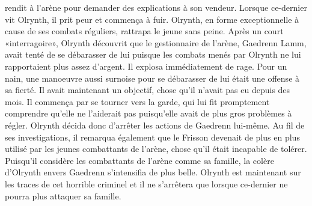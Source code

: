 \documentclass[main.tex]{subfiles}
\begin{document}
    rendit à l'arène pour demander des explications à son vendeur. Lorsque ce-dernier vit Olrynth, il prit peur
    et commença à fuir. Olrynth, en forme exceptionnelle à cause de ses combats réguliers, rattrapa le jeune
    sans peine. Après un court «interragoire», Olrynth découvrit que le gestionnaire de l'arène, Gaedrenn Lamm,
    avait tenté de se débarasser de lui puisque les combats menés par Olrynth ne lui rapportaient plus assez
    d'argent. Il explosa immédiatement de rage. Pour un nain, une manoeuvre aussi surnoise pour se débarasser
    de lui était une offense à sa fierté. Il avait maintenant un objectif, chose qu'il n'avait pas eu depuis des
    mois. Il commença par se tourner vers la garde, qui lui fit promptement comprendre qu'elle ne l'aiderait pas
    puisqu'elle avait de plus gros problèmes à régler. Olrynth décida donc d'arrêter les actions de Gaedrenn
    lui-même. Au fil de ses investigations, il remarqua également que le Frisson devenait de plus en plus 
    utilisé par les jeunes combattants de l'arène, chose qu'il était incapable de tolérer. Puisqu'il considère 
    les combattants de l'arène comme sa famille, la colère d'Olrynth envers Gaedrenn s'intensifia de plus 
    belle. Olrynth est maintenant sur les traces de cet horrible criminel et il ne s'arrêtera que lorsque 
    ce-dernier ne pourra plus attaquer sa famille.
\end{document}
